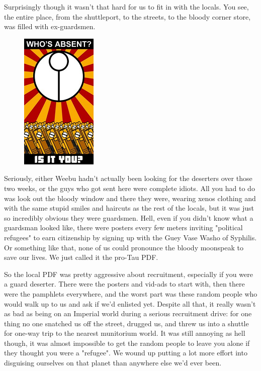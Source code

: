 Surprisingly though it wasn't that hard for us to fit in with the locals. 
You see, the entire place, from the shuttleport, to the streets, to the bloody corner store, was filled with ex-guardsmen.

\begin{figure}
	\begin{center}
		\includegraphics[width=\figwidth]{pics/10/37.png}
	\end{center}
\end{figure}
Seriously, either Weebu hadn't actually been looking for the deserters over those two weeks, or the guys who got sent here were complete idiots. 
All you had to do was look out the bloody window and there they were, wearing xenos clothing and with the same stupid smiles and haircuts as the rest of the locals, but it was just so incredibly obvious they were guardsmen. 
Hell, even if you didn't know what a guardsman looked like, there were posters every few meters inviting "political refugees" to earn citizenship by signing up with the Guey Vase Washo of Syphilis. 
Or something like that, none of us could pronounce the bloody moonspeak to save our lives. 
We just called it the pro-Tau PDF.

So the local PDF was pretty aggressive about recruitment, especially if you were a guard deserter. 
There were the posters and vid-ads to start with, then there were the pamphlets everywhere, and the worst part was these random people who would walk up to us and ask if we'd enlisted yet. 
Despite all that, it really wasn't as bad as being on an Imperial world during a serious recruitment drive: 
for one thing no one snatched us off the street, drugged us, and threw us into a shuttle for one-way trip to the nearest munitorium world. 
It was still annoying as hell though, it was almost impossible to get the random people to leave you alone if they thought you were a "refugee". 
We wound up putting a lot more effort into disguising ourselves on that planet than anywhere else we'd ever been.

